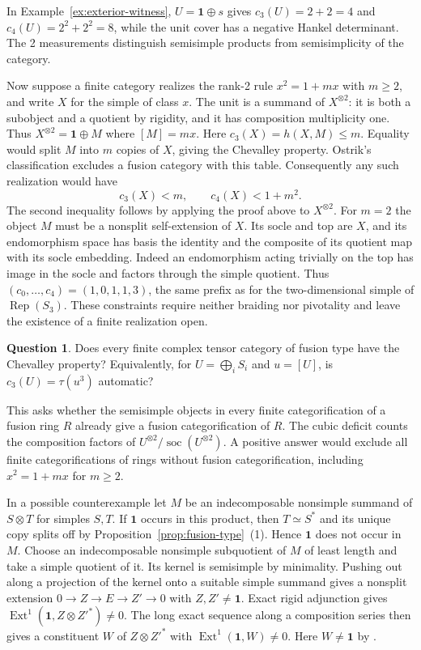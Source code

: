 \documentclass[11pt,reqno]{amsart}
\theoremstyle{definition}
\newtheorem{question}[theorem]{Question}
\newcommand{\Ext}{\operatorname{Ext}}
\newcommand{\one}{\mathbf 1}
\newcommand{\Rep}{\operatorname{Rep}}
\begin{document}
In Example~\ref{ex:exterior-witness}, $U=\one\oplus s$ gives $c_3(U)=2+2=4$ and $c_4(U)=2^2+2^2=8$, while the unit cover has a negative Hankel determinant. The 2 measurements distinguish semisimple products from semisimplicity of the category.

Now suppose a finite category realizes the rank-2 rule $x^2=1+mx$ with $m\ge2$, and write $X$ for the simple of class $x$. The unit is a summand of $X^{\otimes2}$: it is both a subobject and a quotient by rigidity, and it has composition multiplicity one. Thus $X^{\otimes2}=\one\oplus M$ where $[M]=mx$. Here $c_3(X)=h(X,M)\le m$. Equality would split $M$ into $m$ copies of $X$, giving the Chevalley property. Ostrik's classification \cite[Main Theorem]{O2} excludes a fusion category with this table. Consequently any such realization would have
\[
             c_3(X)<m,\qquad c_4(X)<1+m^2 .
\]
The second inequality follows by applying the proof above to $X^{\otimes2}$. For $m=2$ the object $M$ must be a nonsplit self-extension of $X$. Its socle and top are $X$, and its endomorphism space has basis the identity and the composite of its quotient map with its socle embedding. Indeed an endomorphism acting trivially on the top has image in the socle and factors through the simple quotient. Thus $(c_0,\ldots,c_4)=(1,0,1,1,3)$, the same prefix as for the two-dimensional simple of $\Rep(S_3)$. These constraints require neither braiding nor pivotality and leave the existence of a finite realization open.

\begin{question}\label{q:fusion-chevalley}
Does every finite complex tensor category of fusion type have the Chevalley property? Equivalently, for $U=\bigoplus_iS_i$ and $u=[U]$, is $c_3(U)=\tau(u^3)$ automatic?
\end{question}
This asks whether the semisimple objects in every finite categorification of a fusion ring $R$ already give a fusion categorification of $R$. The cubic deficit counts the composition factors of $U^{\otimes2}/\operatorname{soc}(U^{\otimes2})$. A positive answer would exclude all finite categorifications of rings without fusion categorification, including $x^2=1+mx$ for $m\ge2$.

In a possible counterexample let $M$ be an indecomposable nonsimple summand of $S\otimes T$ for simples $S,T$. If $\one$ occurs in this product, then $T\simeq S^*$ and its unique copy splits off by Proposition~\ref{prop:fusion-type}~(1). Hence $\one$ does not occur in $M$. Choose an indecomposable nonsimple subquotient of $M$ of least length and take a simple quotient of it. Its kernel is semisimple by minimality. Pushing out along a projection of the kernel onto a suitable simple summand gives a nonsplit extension $0\to Z\to E\to Z'\to0$ with $Z,Z'\ne\one$. Exact rigid adjunction gives $\Ext^1(\one,Z\otimes Z'^*)\ne0$. The long exact sequence along a composition series then gives a constituent $W$ of $Z\otimes Z'^*$ with $\Ext^1(\one,W)\ne0$. Here $W\ne\one$ by \cite[Theorem~4.4.1]{EGNO}.
\end{document}

